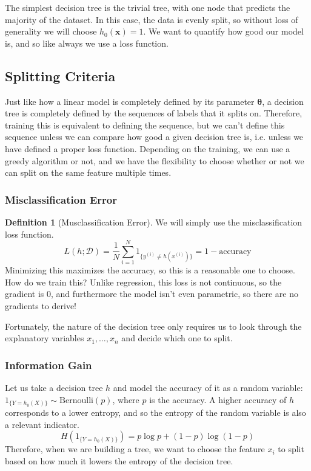 \documentclass{article}
\theoremstyle{definition}
\newtheorem{definition}{Definition}[section]
\begin{document}
  The simplest decision tree is the trivial tree, with one node that predicts the majority of the dataset. In this case, the data is evenly split, so without loss of generality we will choose $h_0 (\mathbf{x}) = 1$. We want to quantify how good our model is, and so like always we use a loss function. 

  \subsection{Splitting Criteria}

  Just like how a linear model is completely defined by its parameter $\boldsymbol{\theta}$, a decision tree is completely defined by the sequences of labels that it splits on. Therefore, training this is equivalent to defining the sequence, but we can't define this sequence unless we can compare how good a given decision tree is, i.e. unless we have defined a proper loss function. Depending on the training, we can use a greedy algorithm or not, and we have the flexibility to choose whether or not we can split on the same feature multiple times. 

  \subsubsection{Misclassification Error}

  \begin{definition}[Musclassification Error]
  We will simply use the misclassification loss function. 
  \[L(h; \mathcal{D}) = \frac{1}{N} \sum_{i=1}^N 1_{\{y^{(i)} \neq h(x^{(i)})\}} = 1 - \text{accuracy}\]
  Minimizing this maximizes the accuracy, so this is a reasonable one to choose. How do we train this? Unlike regression, this loss is not continuous, so the gradient is $0$, and furthermore the model isn't even parametric, so there are no gradients to derive! 
  \end{definition}

  Fortunately, the nature of the decision tree only requires us to look through the explanatory variables $x_1, \ldots, x_n$ and decide which one to split. 

  \subsubsection{Information Gain}

  Let us take a decision tree $h$ and model the accuracy of it as a random variable: $1_{\{Y = h_0 (X)\}} \sim \mathrm{Bernoulli}(p)$, where $p$ is the accuracy. A higher accuracy of $h$ corresponds to a lower entropy, and so the entropy of the random variable is also a relevant indicator. 
  \[H(1_{\{Y = h_0 (X)\}}) = p \log{p} + (1 - p) \log(1 - p)\]
  Therefore, when we are building a tree, we want to choose the feature $x_i$ to split based on how much it lowers the entropy of the decision tree. 
\end{document}
